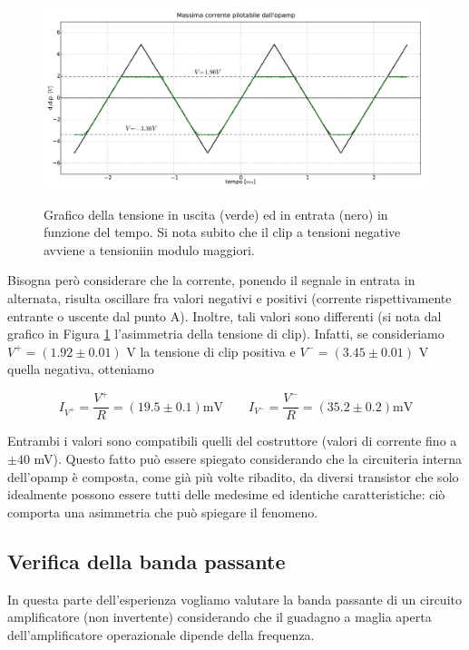\begin{figure}[ht]
 \centering
   {\includegraphics[width=\textwidth]{../E03/latex/clip.pdf}}
 \caption{Grafico della tensione in uscita (verde) ed in entrata (nero) in funzione del tempo. Si nota subito che il clip a tensioni negative avviene a tensioniin modulo maggiori.}
 \label{gr3:clip}
\end{figure}

Bisogna però considerare che la corrente, ponendo il segnale in entrata in alternata, risulta oscillare fra valori negativi e positivi (corrente rispettivamente entrante o uscente dal punto A). Inoltre, tali valori sono differenti (si nota dal grafico in Figura \ref{gr3:clip} l'asimmetria della tensione di clip). Infatti, se consideriamo $V^+ = (1.92 \pm 0.01)$ \si{\volt} la tensione di clip positiva e $V^- = (3.45 \pm 0.01)$ \si{\volt} quella negativa, otteniamo

$$I_{V^+} = \frac{V^+}{R} = (19.5 \pm 0.1) \si{\milli\volt}  \qquad I_{V^-} = \frac{V^-}{R} = (35.2 \pm 0.2) \si{\milli\volt}$$

Entrambi i valori sono compatibili quelli del costruttore (valori di corrente fino a $\pm 40$ \si{\milli\volt}). Questo fatto può essere spiegato considerando che la circuiteria interna dell'opamp è composta, come già più volte ribadito, da diversi transistor che solo idealmente possono essere tutti delle medesime ed identiche caratteristiche: ciò comporta una asimmetria che può spiegare il fenomeno.

\subsection{Verifica della banda passante}
\label{par3:bode}

In questa parte dell'esperienza vogliamo valutare la banda passante di un circuito amplificatore (non invertente) considerando che il guadagno a maglia aperta dell'amplificatore operazionale dipende della frequenza.

